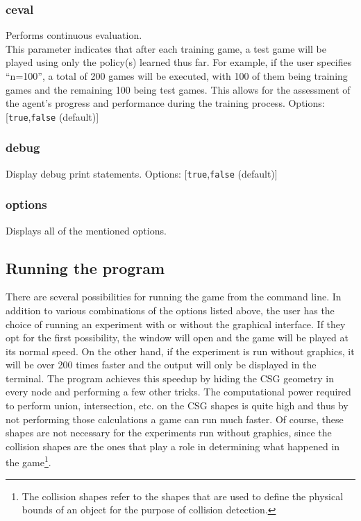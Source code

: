 \subsubsection*{ceval}
\label{opt:ceval}
Performs continuous evaluation.\\
This parameter indicates that after each training game, a test game will be played using only the policy(s) learned thus far. For example, if the user specifies ``n=100'', a total of 200 games will be executed, with 100 of them being training games and the remaining 100 being test games. This allows for the assessment of the agent's progress and performance during the training process. 
Options: [\texttt{true},\texttt{false} (default)]

\subsubsection*{debug}
\label{opt:debug}
Display debug print statements.
Options: [\texttt{true},\texttt{false} (default)]

\subsubsection*{options}
\label{opt:options}
Displays all of the mentioned options.


\subsection{Running the program}
There are several possibilities for running the game from the command line. In addition to various combinations of the options listed above, the user has the choice of running an experiment with or without the graphical interface. If they opt for the first possibility, the window will open and the game will be played at its normal speed. On the other hand, if the experiment is run without graphics, it will be over 200 times faster and the output will only be displayed in the terminal. The program achieves this speedup by hiding the CSG geometry in every node and performing a few other tricks. The computational power required to perform union, intersection, etc. on the CSG shapes is quite high and thus by not performing those calculations a game can run much faster. Of course, these shapes are not necessary for the experiments run without graphics, since the collision shapes are the ones that play a role in determining what happened in the game\footnote{The collision shapes refer to the shapes that are used to define the physical bounds of an object for the purpose of collision detection.}.

